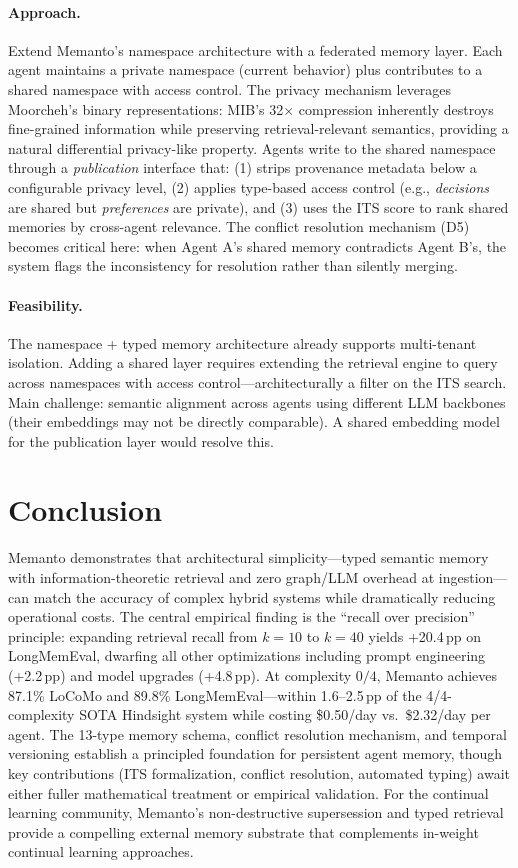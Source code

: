 \documentclass[11pt]{article}
\begin{document}
\paragraph{Approach.}
Extend Memanto's namespace architecture with a federated memory layer. Each agent maintains a private namespace (current behavior) plus contributes to a shared namespace with access control. The privacy mechanism leverages Moorcheh's binary representations: MIB's 32$\times$ compression inherently destroys fine-grained information while preserving retrieval-relevant semantics, providing a natural differential privacy-like property. Agents write to the shared namespace through a \emph{publication} interface that: (1) strips provenance metadata below a configurable privacy level, (2) applies type-based access control (e.g., \emph{decisions} are shared but \emph{preferences} are private), and (3) uses the ITS score to rank shared memories by cross-agent relevance. The conflict resolution mechanism (D5) becomes critical here: when Agent A's shared memory contradicts Agent B's, the system flags the inconsistency for resolution rather than silently merging.

\paragraph{Feasibility.}
The namespace + typed memory architecture already supports multi-tenant isolation. Adding a shared layer requires extending the retrieval engine to query across namespaces with access control---architecturally a filter on the ITS search. Main challenge: semantic alignment across agents using different LLM backbones (their embeddings may not be directly comparable). A shared embedding model for the publication layer would resolve this.

\section{Conclusion}

Memanto demonstrates that architectural simplicity---typed semantic memory with information-theoretic retrieval and zero graph/LLM overhead at ingestion---can match the accuracy of complex hybrid systems while dramatically reducing operational costs. The central empirical finding is the ``recall over precision'' principle: expanding retrieval recall from $k{=}10$ to $k{=}40$ yields +20.4\,pp on LongMemEval, dwarfing all other optimizations including prompt engineering (+2.2\,pp) and model upgrades (+4.8\,pp). At complexity $0/4$, Memanto achieves 87.1\% LoCoMo and 89.8\% LongMemEval---within 1.6--2.5\,pp of the 4/4-complexity SOTA Hindsight system while costing \$0.50/day vs.\ \$2.32/day per agent. The 13-type memory schema, conflict resolution mechanism, and temporal versioning establish a principled foundation for persistent agent memory, though key contributions (ITS formalization, conflict resolution, automated typing) await either fuller mathematical treatment or empirical validation. For the continual learning community, Memanto's non-destructive supersession and typed retrieval provide a compelling external memory substrate that complements in-weight continual learning approaches.
\end{document}
